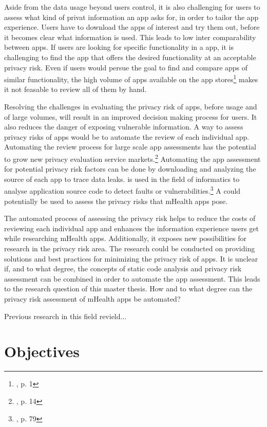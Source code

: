 \documentclass[
	a4paper,
	oneside,
	12pt,
	liststotocnumbered
]{article}
\let\cite\textcite
\begin{document}
Aside from the data usage beyond users control, it is also challenging for users to assess what kind of privat information an app asks for, in order to tailor the app experience. 
Users have to download the apps of interest and try them out, before it becomes clear what information is used. 
This leads to low inter comparability between apps. If users are looking for specific functionality in a \mH app, it is challenging to find the app that offers the desired functionality at an acceptable privacy risk. 
Even if users would persue the goal to find and compare \mH apps of similar functionality, the high volume of apps available on the app stores\footnote{\cite{Enck2011}, p. 1} makes it not feasable to review all of them by hand.

Resolving the challenges in evaluating the privacy risk of \mH apps, before usage and of large volumes, will result in an improved decision making process for users. 
It also reduces the danger of exposing vulnerable information. 
A way to assess privacy risks of \mH apps would be to automate the review of each individual app. 
Automating the review process for large scale app assessments has the potential to grow new privacy evaluation service markets.\footnote{\cite{Enck2011}, p. 14}
Automating the app assessment for potential privacy risk factors  can be done by downloading and analyzing the source of each app to trace data leaks. 
\Sca is used in the field of informatics to analyse application source code to detect faults or vulnerabilities.\footnote{\cite{Baca2008}, p. 79} 
A \sca could potentially be used to assess the privacy risks that mHealth apps pose.

The automated process of assessing the privacy risk helps to reduce the costs of reviewing each individual app and enhances the information experience users get while researching mHealth apps.
Additionally, it exposes new possibilities for research in the privacy risk area. The research could be conducted on providing solutions and best practices for minimizing the privacy risk of apps.
It is unclear if, and to what degree, the concepts of static code analysis and privacy risk assessment can be combined in order to automate the app assessment.
This leads to the research question of this master thesis. How and to what degree can the privacy risk assessment of mHealth apps be automated?

Previous research in this field revield...

\section{Objectives}
\end{document}
